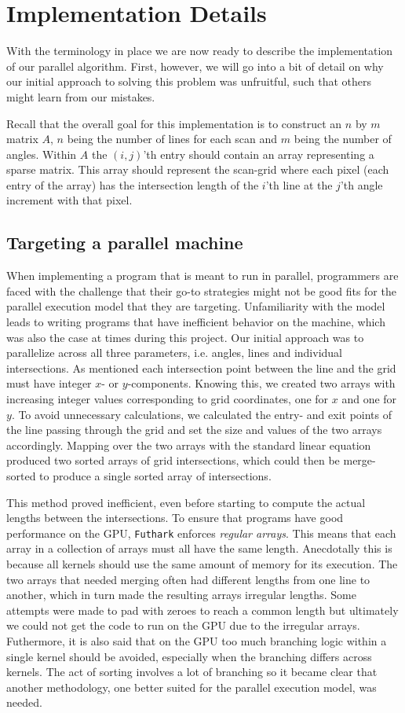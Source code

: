 \section{Implementation Details}
With the terminology in place we are now ready to describe the implementation of our parallel algorithm. First, however, we will go into a bit of detail on why our initial approach to solving this problem was unfruitful, such that others might learn from our mistakes.

Recall that the overall goal for this implementation is to construct an $n$ by $m$ matrix $A$, $n$ being the number of lines for each scan and $m$ being the number of angles. Within $A$ the $(i, j)$'th entry should contain an array representing a sparse matrix. This array should represent the scan-grid where each pixel (each entry of the array) has the intersection length of the $i$'th line at the $j$'th angle increment with that pixel.

\subsection{Targeting a parallel machine}
When implementing a program that is meant to run in parallel, programmers are faced with the challenge that their go-to strategies might not be good fits for the parallel execution model that they are targeting. Unfamiliarity with the model leads to writing programs that have inefficient behavior on the machine, which was also the case at times during this project. Our initial approach was to parallelize across all three parameters, i.e. angles, lines and individual intersections. As mentioned each intersection point between the line and the grid must have integer $x$- or $y$-components. Knowing this, we created two arrays with increasing integer values corresponding to grid coordinates, one for $x$ and one for $y$. To avoid unnecessary calculations, we calculated the entry- and exit points of the line passing through the grid and set the size and values of the two arrays accordingly.  Mapping over the two arrays with the standard linear equation produced two sorted arrays of grid intersections, which could then be merge-sorted to produce a single sorted array of intersections. 

This method proved inefficient, even before starting to compute the actual lengths between the intersections. To ensure that programs have good performance on the GPU, \texttt{Futhark} enforces \emph{regular arrays}. This means that each array in a collection of arrays must all have the same length. Anecdotally this is because all kernels should use the same amount of memory for its execution. The two arrays that needed merging often had different lengths from one line to another, which in turn made the resulting arrays irregular lengths. Some attempts were made to pad with zeroes to reach a common length but ultimately we could not get the code to run on the GPU due to the irregular arrays. Futhermore, it is also said that on the GPU too much branching logic within a single kernel should be avoided, especially when the branching differs across kernels. The act of sorting involves a lot of branching so it became clear that another methodology, one better suited for the parallel execution model, was needed.

